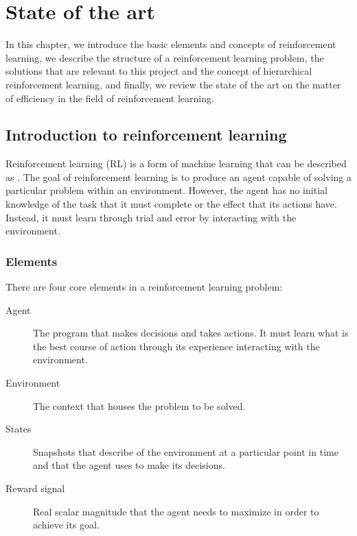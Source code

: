 \chapter{State of the art}
\label{chapter:state_of_the_art}

In this chapter, we introduce the basic elements and concepts of reinforcement learning, we describe the structure of a reinforcement learning problem, the solutions that are relevant to this project and the concept of hierarchical reinforcement learning, and finally, we review the state of the art on the matter of efficiency in the field of reinforcement learning.

\section{Introduction to reinforcement learning}

Reinforcement learning (RL) is a form of machine learning that can be described as  \cite{Kaelbling:1996}. The goal of reinforcement learning is to produce an agent capable of solving a particular problem within an environment. However, the agent has no initial knowledge of the task that it must complete or the effect that its actions have. Instead, it must learn through trial and error by interacting with the environment.

\subsection{Elements}

There are four core elements in a reinforcement learning problem:

\begin{description}
    \item[Agent] The program that makes decisions and takes actions. It must learn what is the best course of action through its experience interacting with the environment.
    \item[Environment] The context that houses the problem to be solved.
    \item[States] Snapshots that describe of the environment at a particular point in time and that the agent uses to make its decisions.
    \item[Reward signal] Real scalar magnitude that the agent needs to maximize in order to achieve its goal.
\end{description}

